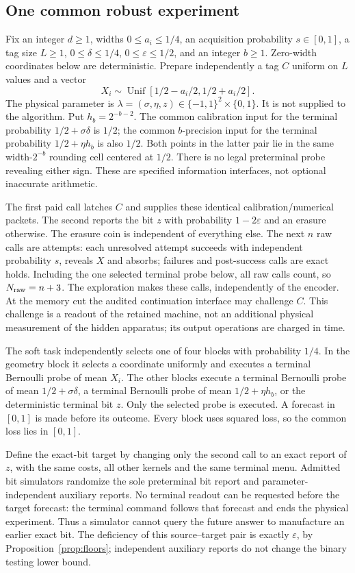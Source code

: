 \subsection{One common robust experiment}
Fix an integer $d\ge1$, widths $0\le a_i\le1/4$, an acquisition probability $s\in[0,1]$, a tag size $L\ge1$, $0\le\delta\le1/4$, $0\le\varepsilon\le1/2$, and an integer $b\ge1$. Zero-width coordinates below are deterministic. Prepare independently a tag $C$ uniform on $L$ values and a vector
\[
 X_i\sim\operatorname{Unif}[1/2-a_i/2,1/2+a_i/2].
\]
The physical parameter is $\lambda=(\sigma,\eta,z)\in\{-1,1\}^2\times\{0,1\}$. It is not supplied to the algorithm. Put $h_b=2^{-b-2}$. The common calibration input for the terminal probability $1/2+\sigma\delta$ is $1/2$; the common $b$-precision input for the terminal probability $1/2+\eta h_b$ is also $1/2$. Both points in the latter pair lie in the same width-$2^{-b}$ rounding cell centered at $1/2$. There is no legal preterminal probe revealing either sign. These are specified information interfaces, not optional inaccurate arithmetic.

The first paid call latches $C$ and supplies these identical calibration/numerical packets. The second reports the bit $z$ with probability $1-2\varepsilon$ and an erasure otherwise. The erasure coin is independent of everything else. The next $n$ raw calls are attempts: each unresolved attempt succeeds with independent probability $s$, reveals $X$ and absorbs; failures and post-success calls are exact holds. Including the one selected terminal probe below, all raw calls count, so $N_{\rm raw}=n+3$. The exploration makes these calls, independently of the encoder. At the memory cut the audited continuation interface may challenge $C$. This challenge is a readout of the retained machine, not an additional physical measurement of the hidden apparatus; its output operations are charged in time.

The soft task independently selects one of four blocks with probability $1/4$. In the geometry block it selects a coordinate uniformly and executes a terminal Bernoulli probe of mean $X_i$. The other blocks execute a terminal Bernoulli probe of mean $1/2+\sigma\delta$, a terminal Bernoulli probe of mean $1/2+\eta h_b$, or the deterministic terminal bit $z$. Only the selected probe is executed. A forecast in $[0,1]$ is made before its outcome. Every block uses squared loss, so the common loss lies in $[0,1]$.

Define the exact-bit target by changing only the second call to an exact report of $z$, with the same costs, all other kernels and the same terminal menu. Admitted bit simulators randomize the sole preterminal bit report and parameter-independent auxiliary reports. No terminal readout can be requested before the target forecast: the terminal command follows that forecast and ends the physical experiment. Thus a simulator cannot query the future answer to manufacture an earlier exact bit. The deficiency of this source--target pair is exactly $\varepsilon$, by Proposition~\ref{prop:floors}; independent auxiliary reports do not change the binary testing lower bound.

